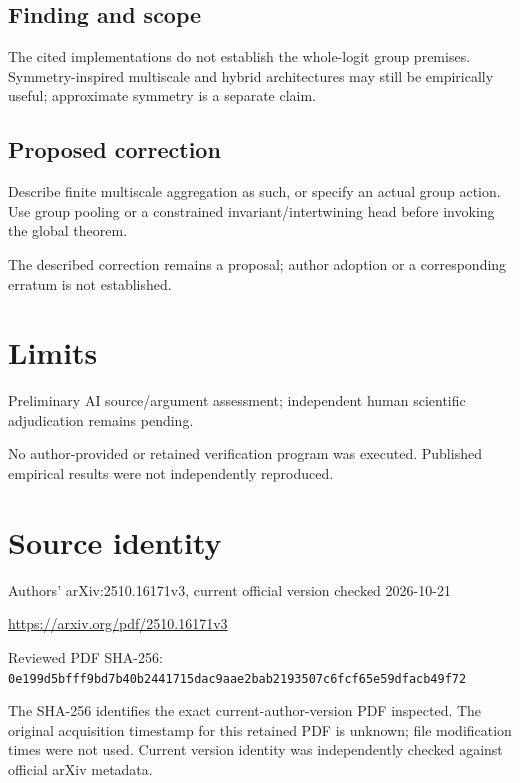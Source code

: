\documentclass[11pt]{article}
\begin{document}
\subsection*{Finding and scope}

The cited implementations do not establish the whole-logit group premises. Symmetry-inspired multiscale and hybrid architectures may still be empirically useful; approximate symmetry is a separate claim.

\subsection*{Proposed correction}

Describe finite multiscale aggregation as such, or specify an actual group action. Use group pooling or a constrained invariant/intertwining head before invoking the global theorem.

The described correction remains a proposal; author adoption or a corresponding erratum is not established.

\section*{Limits}

Preliminary AI source/argument assessment; independent human scientific adjudication remains pending.\par

No author-provided or retained verification program was executed. Published empirical results were not independently reproduced.\par

\section*{Source identity}

Authors’ arXiv:2510.16171v3, current official version checked 2026-10-21

\url{https://arxiv.org/pdf/2510.16171v3}

Reviewed PDF SHA-256: \nolinkurl{0e199d5bfff9bd7b40b2441715dac9aae2bab2193507c6fcf65e59dfacb49f72}

The SHA-256 identifies the exact current-author-version PDF inspected. The original acquisition timestamp for this retained PDF is unknown; file modification times were not used. Current version identity was independently checked against official arXiv metadata.
\end{document}
